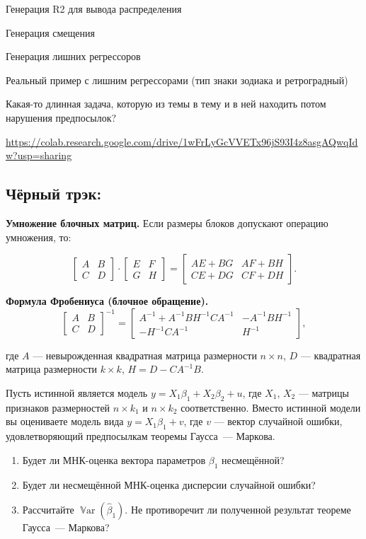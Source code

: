 \documentclass[12pt]{article}
\DeclareMathOperator{\Var}{\mathbb{V}ar}
\renewcommand{\b}{\beta}
\newcommand{\hb}{\hat{\beta}}
\begin{document}
Генерация R2 для вывода распределения

Генерация смещения

Генерация лишних регрессоров

Реальный пример с лишним регрессорами (тип знаки зодиака и ретроградный)

Какая-то длинная задача, которую из темы в тему и в ней находить потом нарушения предпосылок?



\url{https://colab.research.google.com/drive/1wFrLyGcVVETx96jS93I4z8asgAQwqIdw?usp=sharing}

\subsection{Чёрный трэк:}

\textbf{Умножение блочных матриц.} Если размеры блоков допускают операцию умножения, то:

\[
\left[
\begin{array}{c|c}
A & B \\
\hline
C & D
\end{array}
\right]
\cdot
\left[
\begin{array}{c|c}
E & F \\
\hline
G & H
\end{array}
\right]
=
\left[
\begin{array}{c|c}
AE + BG &  AF+BH\\
\hline
CE+DG & CF+DH
\end{array}
\right].
\]

\bigskip

\textbf{Формула Фробениуса (блочное обращение).}
\[
\left[
\begin{array}{c|c}
A & B \\
\hline
C & D
\end{array}
\right]^{-1}=
\left[
\begin{array}{c|c}
A^{-1}+A^{-1}BH^{-1}CA^{-1} & -A^{-1}BH^{-1} \\
\hline
-H^{-1}CA^{-1} & H^{-1}
\end{array}
\right],
\]

где $A$ --- невырожденная квадратная матрица размерности $n \times n$, $D$ --- квадратная матрица размерности $k \times k$, $H = D - CA^{-1}B$.

\begin{problem}
Пусть истинной является модель $y = X_1\b_1+ X_2\b_2+u$, где $X_1$, $X_2$  --- матрицы признаков размерностей $n \times k_1$ и $n \times k_2$ соответственно. Вместо истинной модели вы оцениваете модель вида $y = X_1\b_1+v$, где $v$ --- вектор случайной ошибки, удовлетворяющий предпосылкам теоремы Гаусса~--- Маркова.
\begin{enumerate}
    \item Будет ли МНК-оценка вектора параметров $\b_1$ несмещённой?
    \item Будет ли несмещённой МНК-оценка дисперсии случайной ошибки?
    \item Рассчитайте $\Var(\hb_1)$. Не противоречит ли полученной результат теореме Гаусса~--- Маркова?
\end{enumerate}
\end{problem}
\end{document}
